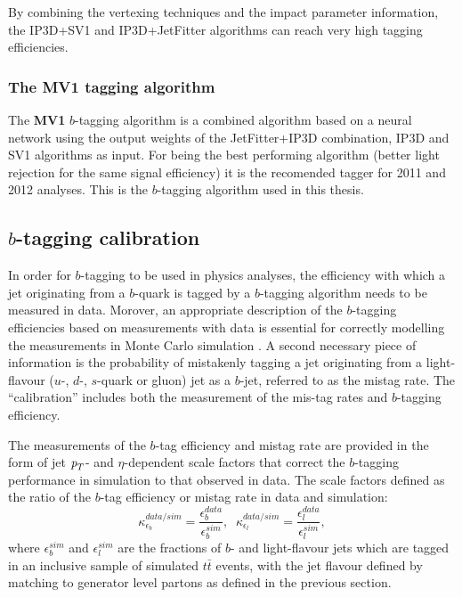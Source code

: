By combining the vertexing techniques and the impact parameter information, the IP3D+SV1 and IP3D+JetFitter algorithms can reach very high tagging efficiencies.


\subsubsection{The MV1 tagging algorithm}


The \textbf{MV1} $b$-tagging algorithm is a combined algorithm based on a neural network using the output weights of the JetFitter+IP3D combination, IP3D and SV1 algorithms as input.  For being the best performing algorithm (better light rejection for the same signal efficiency) it is the recomended tagger for 2011 and 2012 analyses. This is the $b$-tagging algorithm used in this thesis.


\subsection{$b$-tagging calibration}


In order for $b$-tagging to be used in physics analyses, the efficiency with which a jet originating from a $b$-quark is tagged by a $b$-tagging algorithm needs to be measured in data.  Morover, an appropriate description of the $b$-tagging efficiencies based on measurements with data is essential for correctly modelling the measurements in Monte Carlo simulation . A second necessary piece of information is the probability of mistakenly tagging a jet originating from a light-flavour ($u$-, $d$-, $s$-quark or gluon) jet as a $b$-jet, referred to as the mistag rate. The ``calibration'' includes both the measurement of the mis-tag rates and $b$-tagging efficiency.


The measurements of the $b$-tag efficiency and mistag rate are provided in the form of jet ${\emph{p}_{T}}$- and $\eta$-dependent scale factors that correct the $b$-tagging performance in simulation to that observed in data.  The scale factors defined as the ratio of the $b$-tag efficiency or mistag rate in data and simulation:
%
\begin{equation}
\kappa_{\epsilon_b}^{data/sim}  = \frac{\epsilon_b^{data}}{\epsilon_b^{sim}}, \; \;   \kappa_{\epsilon_l}^{data/sim}  = \frac{\epsilon_l^{data}}{\epsilon_l^{sim}},
\end{equation}
%
where $\epsilon_b^{sim}$ and $\epsilon_l^{sim}$ are the fractions of $b$- and light-flavour jets which are tagged in an inclusive sample of simulated $t\bar{t}$ events, with the jet flavour defined by matching to generator level partons as defined in the previous section. %

